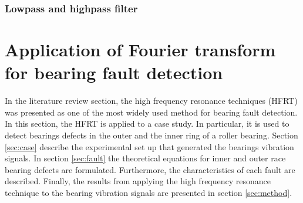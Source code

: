 \documentclass[../Main/thesis.tex]{subfiles}
\begin{document}
\subsubsection{Lowpass and highpass filter}
\label{sec:other-filters}


\clearpage


\section{Application of Fourier transform for bearing fault detection}
\label{sec:application}
In the literature review section, the high frequency resonance techniques (HFRT) was presented as one of the most widely used method for bearing fault detection. In this section, the HFRT is applied to a case study. In particular, it is used to detect bearings defects in the outer and the inner ring of a roller bearing.
\justify
Section \ref{sec:case} describe the experimental set up that generated the bearings vibration signals. In section \ref{sec:fault} the theoretical equations for inner and outer race bearing defects are formulated. Furthermore, the characteristics of each fault are described.
Finally, the results from applying the high frequency resonance technique to the bearing vibration signals are presented in section \ref{sec:method}.


\end{document}
